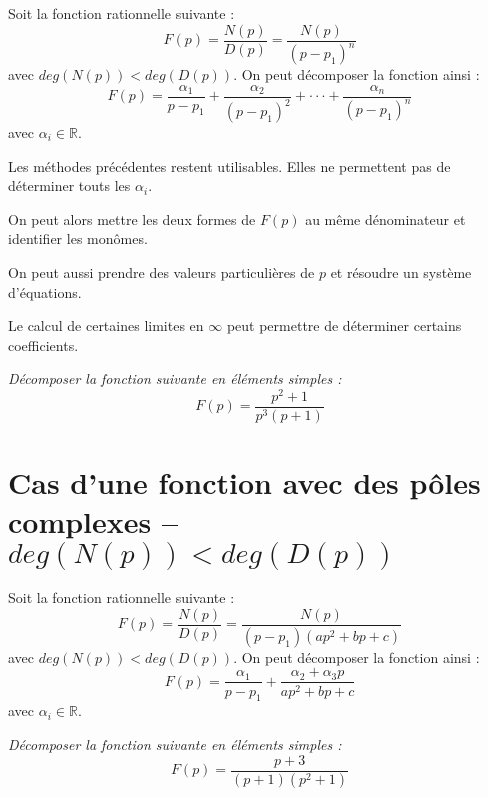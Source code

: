 \documentclass[10pt,fleqn]{article} %
\begin{document}
\begin{resultat}
Soit la fonction rationnelle suivante :
$$
F(p) = \dfrac{N(p)}{D(p)} =\dfrac{N(p)}{(p-p_1)^n}
$$
avec $deg(N(p)) < deg(D(p))$. On peut décomposer la fonction ainsi :
$$
F(p) = \dfrac{\alpha_1}{p-p_1} + \dfrac{\alpha_2}{\left(p-p_1\right)^2} 
+ \cdot \cdot \cdot + 
\dfrac{\alpha_n}{\left(p-p_1\right)^n} 
$$
avec $\alpha_i\in \mathbb{R}$.
\end{resultat}


\begin{resultat}
Les méthodes précédentes restent utilisables. Elles ne permettent pas de déterminer touts les $\alpha_i$. 

On peut alors mettre les deux formes de $F(p)$ au même dénominateur et identifier les monômes. 

On peut aussi prendre des valeurs particulières de $p$ et résoudre un système d'équations.

Le calcul de certaines limites en $\infty$ peut permettre de déterminer certains coefficients. 
\end{resultat}
\begin{exemple}
\textit{Décomposer la fonction suivante en éléments simples :}
$$
F(p)=\dfrac{p^2+1}{p^3(p+1)}
$$
\end{exemple}



\section{Cas d'une fonction avec des pôles complexes -- $deg(N(p)) < deg(D(p))$}

\begin{resultat}
Soit la fonction rationnelle suivante :
$$
F(p) = \dfrac{N(p)}{D(p)} =\dfrac{N(p)}{(p-p_1)(ap^2+bp+c)}
$$
avec $deg(N(p)) < deg(D(p))$. On peut décomposer la fonction ainsi :
$$
F(p) = \dfrac{\alpha_1}{p-p_1} + \dfrac{\alpha_2 + \alpha_3 p}{ap^2+bp+c} 
$$
avec $\alpha_i\in \mathbb{R}$.
\end{resultat}



\begin{exemple}
\textit{Décomposer la fonction suivante en éléments simples :}
$$
F(p)=\dfrac{p+3}{(p+1)(p^2+1)}
$$
\end{exemple}
\end{document}
